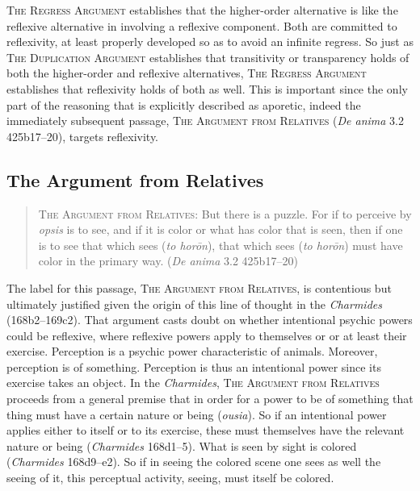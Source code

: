 \textsc{The Regress Argument} establishes that the higher-order alternative is like the reflexive alternative in involving a reflexive component. Both are committed to reflexivity, at least properly developed so as to avoid an infinite regress. So just as \textsc{The Duplication Argument} establishes that transitivity or transparency holds of both the higher-order and reflexive alternatives, \textsc{The Regress Argument} establishes that reflexivity holds of both as well. This is important since the only part of the reasoning that is explicitly described as aporetic, indeed the immediately subsequent passage, \textsc{The Argument from Relatives} (\emph{De anima} 3.2 425b17–20), targets reflexivity.


\subsection{The Argument from Relatives} %
\label{sub:the_argument_from_relatives}

\begin{quote}
	\textsc{The Argument from Relatives}: But there is a puzzle. For if to perceive by \emph{opsis} is to see, and if it is color or what has color that is seen, then if one is to see that which sees (\emph{to horōn}), that which sees (\emph{to horōn}) must have color in the primary way. (\emph{De anima} 3.2 425b17–20)
\end{quote}

The label for this passage, \textsc{The Argument from Relatives}, is contentious but ultimately justified given the origin of this line of thought in the \emph{Charmides} (168b2–169c2). That argument casts doubt on whether intentional psychic powers could be reflexive, where reflexive powers apply to themselves or or at least their exercise. Perception is a psychic power characteristic of animals. Moreover, perception is of something. Perception is thus an intentional power since its exercise takes an object. In the \emph{Charmides}, \textsc{The Argument from Relatives} proceeds from a general premise that in order for a power to be of something that thing must have a certain nature or being (\emph{ousia}). So if an intentional power applies either to itself or to its exercise, these must themselves have the relevant nature or being (\emph{Charmides} 168d1–5). What is seen by sight is colored (\emph{Charmides} 168d9–e2). So if in seeing the colored scene one sees as well the seeing of it, this perceptual activity, seeing, must itself be colored.

